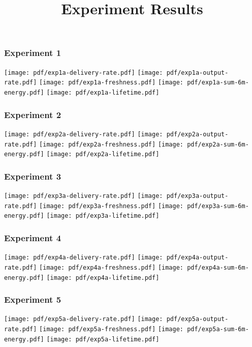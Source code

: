 \documentclass{article}
\begin{document}
\title{Experiment Results}

\subsubsection{Experiment 1}
\texttt{[image: pdf/exp1a-delivery-rate.pdf]}
\texttt{[image: pdf/exp1a-output-rate.pdf]}
\texttt{[image: pdf/exp1a-freshness.pdf]}
\texttt{[image: pdf/exp1a-sum-6m-energy.pdf]}
\texttt{[image: pdf/exp1a-lifetime.pdf]}

\subsubsection{Experiment 2}
\texttt{[image: pdf/exp2a-delivery-rate.pdf]}
\texttt{[image: pdf/exp2a-output-rate.pdf]}
\texttt{[image: pdf/exp2a-freshness.pdf]}
\texttt{[image: pdf/exp2a-sum-6m-energy.pdf]}
\texttt{[image: pdf/exp2a-lifetime.pdf]}

\subsubsection{Experiment 3}
\texttt{[image: pdf/exp3a-delivery-rate.pdf]}
\texttt{[image: pdf/exp3a-output-rate.pdf]}
\texttt{[image: pdf/exp3a-freshness.pdf]}
\texttt{[image: pdf/exp3a-sum-6m-energy.pdf]}
\texttt{[image: pdf/exp3a-lifetime.pdf]}

\subsubsection{Experiment 4}
\texttt{[image: pdf/exp4a-delivery-rate.pdf]}
\texttt{[image: pdf/exp4a-output-rate.pdf]}
\texttt{[image: pdf/exp4a-freshness.pdf]}
\texttt{[image: pdf/exp4a-sum-6m-energy.pdf]}
\texttt{[image: pdf/exp4a-lifetime.pdf]}


\subsubsection{Experiment 5}
\texttt{[image: pdf/exp5a-delivery-rate.pdf]}
\texttt{[image: pdf/exp5a-output-rate.pdf]}
\texttt{[image: pdf/exp5a-freshness.pdf]}
\texttt{[image: pdf/exp5a-sum-6m-energy.pdf]}
\texttt{[image: pdf/exp5a-lifetime.pdf]}
\end{document}
